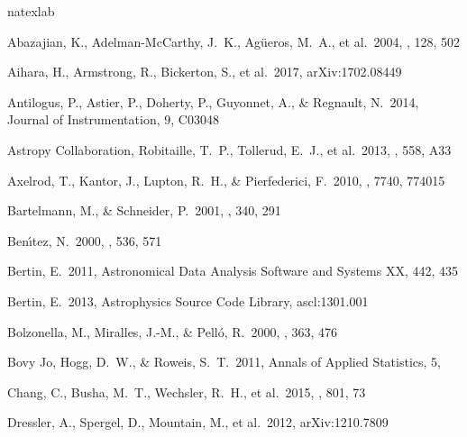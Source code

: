 \documentclass[useamsfonts]{pasj01}
\begin{document}
\begin{thebibliography}{}
    \label{sec:ref}
    \expandafter\ifx\csname natexlab\endcsname\relax\def\natexlab#1{#1}\fi

     Abazajian, K., Adelman-McCarthy,
             J.~K., Ag{\"u}eros, M.~A., et al.\ 2004, \aj, 128, 502

     Aihara, H., Armstrong, R., Bickerton, S.,
             et al.\ 2017, arXiv:1702.08449

     Antilogus, P., Astier, P.,
             Doherty, P., Guyonnet, A., \& Regnault, N.\ 2014, Journal of
             Instrumentation, 9, C03048

     Astropy Collaboration,
             Robitaille, T.~P., Tollerud, E.~J., et al.\ 2013, \aap, 558, A33

     Axelrod, T., Kantor, J., Lupton,
             R.~H., \& Pierfederici, F.\ 2010, \procspie, 7740, 774015

     Bartelmann, M., \&
             Schneider, P.\ 2001, \physrep, 340, 291

     Ben{\'{\i}}tez, N.\ 2000, \apj,
             536, 571

     Bertin, E.\ 2011, Astronomical Data Analysis
             Software and Systems XX, 442, 435

     Bertin, E.\ 2013, Astrophysics Source
             Code Library, ascl:1301.001

     Bolzonella, M., Miralles, J.-M.,
            \& Pell{\'o}, R.\ 2000, \aap, 363, 476

     Bovy Jo, Hogg, D.~W., \& Roweis,
             S.~T.\ 2011, Annals of Applied Statistics, 5,

     Chang, C., Busha, M.~T., Wechsler, R.~H.,
             et al.\ 2015, \apj, 801, 73

     Dressler, A., Spergel, D., Mountain,
             M., et al.\ 2012, arXiv:1210.7809


\end{thebibliography}
\end{document}
